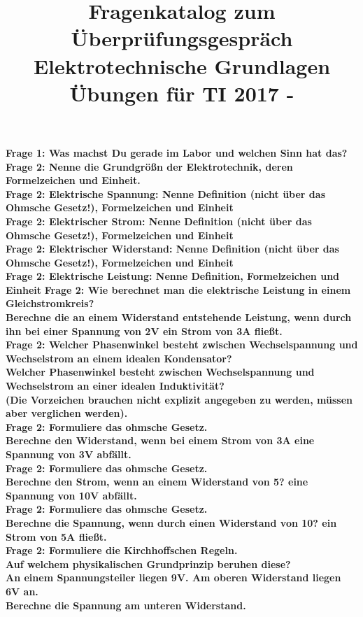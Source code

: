 \documentclass[11pt,a4paper]{scrartcl}
\title{\textbf{Fragenkatalog zum Überprüfungsgespräch Elektrotechnische Grundlagen Übungen für TI 2017 - \UE}}
\author{\name}
\begin{document}
\maketitle

\textbf{Frage 1: Was machst Du gerade im Labor und welchen Sinn hat das?}\\
\textbf{Frage 2: Nenne die Grundgrößn der Elektrotechnik, deren Formelzeichen und Einheit.}\\
\textbf{Frage 2: Elektrische Spannung: Nenne Definition (nicht über das Ohmsche Gesetz!), Formelzeichen und Einheit}\\
\textbf{Frage 2: Elektrischer Strom: Nenne Definition (nicht über das Ohmsche Gesetz!), Formelzeichen und Einheit}\\
\textbf{Frage 2: Elektrischer Widerstand: Nenne Definition (nicht über das Ohmsche Gesetz!), Formelzeichen und Einheit}\\
\textbf{Frage 2: Elektrische Leistung: Nenne Definition, Formelzeichen und Einheit}
\textbf{Frage 2: Wie berechnet man die elektrische Leistung in einem Gleichstromkreis?\\
Berechne die an einem Widerstand entstehende Leistung, wenn durch ihn bei einer Spannung von 2V ein Strom von 3A fließt.}\\
\textbf{Frage 2: Welcher Phasenwinkel besteht zwischen Wechselspannung und Wechselstrom an einem idealen Kondensator?\\
Welcher Phasenwinkel besteht zwischen Wechselspannung und Wechselstrom an einer idealen Induktivität?\\
(Die Vorzeichen brauchen nicht explizit angegeben zu werden, müssen aber verglichen werden).}\\
\textbf{Frage 2: Formuliere das ohmsche Gesetz.\\
Berechne den Widerstand, wenn bei einem Strom von 3A eine Spannung von 3V abfällt.}\\
\textbf{Frage 2: Formuliere das ohmsche Gesetz.\\
Berechne den Strom, wenn an einem Widerstand von 5? eine Spannung von 10V abfällt.}\\
\textbf{Frage 2: Formuliere das ohmsche Gesetz.\\
Berechne die Spannung, wenn durch einen Widerstand von 10? ein Strom von 5A fließt. }\\
\textbf{Frage 2: Formuliere die Kirchhoffschen Regeln.\\
Auf welchem physikalischen Grundprinzip beruhen diese?\\
An einem Spannungsteiler liegen 9V. Am oberen Widerstand liegen 6V an.\\
Berechne die Spannung am unteren Widerstand.}\\
\end{document}
